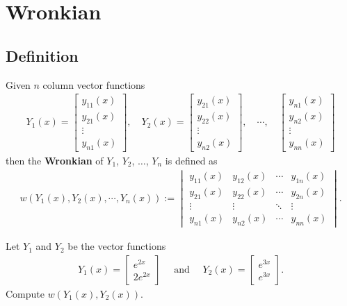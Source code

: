 \documentclass[12pt,a4paper]{article}
\newcounter{example}[section]
\begin{document}
	
	\newpage
	
	\section{Wronkian}
	
	\subsection{Definition}
	Given $n$ column vector functions
		\begin{align*}
		Y_1 (x) = \begin{bmatrix}
		y_{11} (x) \\ y_{21} (x) \\ \vdots \\ y_{n1} (x)
		\end{bmatrix} , \quad Y_2 (x) = \begin{bmatrix}
		y_{21} (x) \\ y_{22} (x) \\ \vdots \\ y_{n2} (x)
		\end{bmatrix} , \quad \cdots , \quad
		\begin{bmatrix}
		y_{n1} (x) \\ y_{n2} (x) \\ \vdots \\ y_{nn} (x)
		\end{bmatrix}
		\end{align*}
	then the \textbf{Wronkian} of $Y_1$, $Y_2$, $\ldots$, $Y_n$ is defined as
		\begin{align*}
		w (Y_1 (x), Y_2 (x), \cdots , Y_n (x)) := \begin{vmatrix}
		y_{11} (x) & y_{12} (x) & \cdots & y_{1n} (x) \\
		y_{21} (x) & y_{22} (x) & \cdots & y_{2n} (x) \\
		\vdots & \vdots & \ddots & \vdots \\
		y_{n1} (x) & y_{n2} (x) & \cdots & y_{nn} (x) 
		\end{vmatrix} .
		\end{align*}
		
	\begin{example}\label{Ex:WronkianCalc}
	Let $Y_1$ and $Y_2$ be the vector functions
		\begin{align*}
		Y_1 (x) = \begin{bmatrix}
		e^{2x} \\ 2e^{2x}
		\end{bmatrix} \quad \text{ and } \quad
		Y_2 (x) = \begin{bmatrix}
		e^{3x} \\ e^{3x}
		\end{bmatrix} .
		\end{align*}
	Compute $w (Y_1 (x), Y_2 (x))$.
	\end{example}
	
\end{document}
